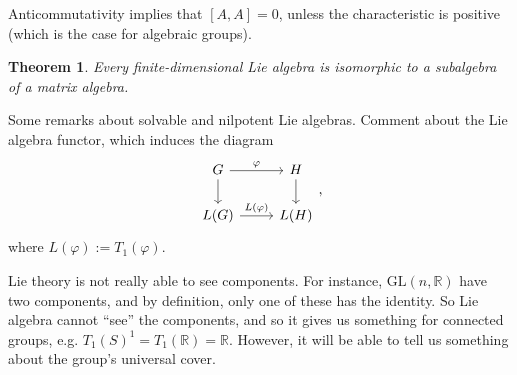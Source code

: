 \documentclass[letterpaper, 12pt]{article}
\newtheorem{thm}{Theorem}[subsection]
\newcommand{\reals}{\mathbb{R}}
\newcommand{\Tone}{T_1}
\newcommand{\T}[1]{\Tone(#1)}
\newcommand{\csq}[9]{\[
	\begin{tikzcd}[ampersand replacement=\&]
	{#1} \arrow{r}{#5} \arrow{d}{#6}
		\& {#2} \arrow{d}{#7} \\
	{#3} \arrow{r}{#8}
		\& {#4}
	\end{tikzcd}
#9\]}
\newcommand{\gl}[2]{\mathrm{GL}(#1, #2)}
\begin{document}
Anticommutativity implies that $[A, A] = 0$, unless the characteristic is
positive (which is the case for algebraic groups).

\begin{thm} Every finite-dimensional Lie algebra is isomorphic to a subalgebra
of a matrix algebra. \end{thm}

Some remarks about solvable and nilpotent Lie algebras. Comment about the Lie
algebra functor, which induces the diagram \csq G H {L(G)} {L(H)} \varphi {}
{} {L(\varphi)}, where $L(\varphi) := \T \varphi$.
 
Lie theory is not really able to see components. For instance, $\gl n \reals$
have two components, and by definition, only one of these has the identity. So
Lie algebra cannot ``see'' the components, and so it gives us something for
connected groups, e.g. $\T S^1 = \T \reals = \reals.$ However, it will be able
to tell us something about the group's universal cover.
\end{document}
